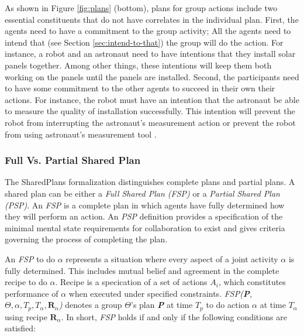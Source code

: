 \documentclass[11pt]{article}
\begin{document}
As shown in Figure \ref{fig:plans} (bottom), plans for group actions include two
essential constituents that do not have correlates in the individual plan.
First, the agents need to have a commitment to the group activity; All the
agents need to intend that (see Section \ref{sec:intend-to-that}) the group will
do the action. For instance, a robot and an astronaut need to have intentions
that they install solar panels together. Among other things, these intentions
will keep them both working on the panels until the panels are installed.
Second, the participants need to have some commitment to the other agents to
succeed in their own their actions. For instance, the robot must have an
intention that the astronaut be able to measure the quality of installation
successfully. This intention will prevent the robot from interrupting the
astronaut's measurement action or prevent the robot from using astronaut's
measurement tool \cite{grosz:collaborative-systems, grosz:plans-discourse}.

\subsubsection{Full Vs. Partial Shared Plan}
\label{sec:full-partial-plan}

The SharedPlans formalization distinguishes complete plans and partial plans. A
shared plan can be either a \textit{Full Shared Plan (FSP)} or a \textit{Partial
Shared Plan (PSP)}. An \textit{FSP} is a complete plan in which agents have fully
determined how they will perform an action. An \textit{PSP} definition provides a
specification of the minimal mental state requirements for collaboration to
exist and gives criteria governing the process of completing the plan. 

An \textit{FSP} to do $\alpha$ represents a situation where every aspect of a
joint activity $\alpha$ is fully determined. This includes mutual belief and
agreement in the complete recipe to do $\alpha$. Recipe is a specication of a
set of actions \textit{$A_i$}, which constitutes performance of $\alpha$ when
executed under specified constraints. \textit{FSP(\textbf{P}, $\Theta, \alpha,
T_p, T_\alpha, \textbf{R}_\alpha$)} denotes a group $\Theta$'s plan
\textit{\textbf{P}} at time \textit{$T_p$} to do action $\alpha$ at time
\textit{$T_\alpha$} using recipe \textit{$\textbf{R}_\alpha$}. In short,
\textit{FSP} holds if and only if the following conditions are satisfied:
\end{document}
